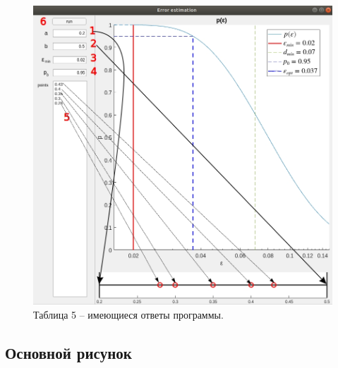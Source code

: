 \documentclass[a4paper,12pt]{article} %
\begin{document}
\begin{figure}[h!]
\begin{center}
\includegraphics[width=1\textwidth]{./pics/whole_window_interval2}
\end{center}
\caption{Таблица 5 -- имеющиеся ответы программы.} \label{img:whole_interval2}
\end{figure}

\newpage

\subsection{Основной рисунок}
\end{document}
